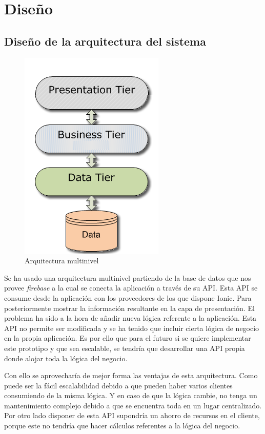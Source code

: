\section{Diseño}
\subsection{Diseño de la arquitectura del sistema}

\begin{figure}[!h]
    \centering
    \includegraphics[]{images/multilevel-architecture.png}
    \caption{Arquitectura multinivel}
    \label{multilevel-architecture}
\end{figure}

Se ha usado una arquitectura multinivel partiendo de la base de datos que nos provee
\textit{firebase} a la cual se conecta la aplicación a través de su API. Esta API
se consume desde la aplicación con los proveedores de los que dispone Ionic. Para
posteriormente mostrar la información resultante en la capa de presentación.
El problema ha sido a la hora de añadir nueva lógica referente a la aplicación.
Esta API no permite ser modificada y se ha tenido que incluir cierta lógica de
negocio en la propia aplicación. Es por ello que para el futuro si se quiere
implementar este prototipo y que sea escalable, se tendría que desarrollar una
API propia donde alojar toda la lógica del negocio.

\medskip
Con ello se aprovecharía de mejor forma las ventajas de esta arquitectura. Como
puede ser la fácil escalabilidad debido a que pueden haber varios clientes
consumiendo de la misma lógica. Y en caso de que la lógica cambie, no tenga un
mantenimiento complejo debido a que se encuentra toda en un lugar centralizado.
Por otro lado disponer de esta API supondría un ahorro de recursos en el cliente,
porque este no tendría que hacer cálculos referentes a la lógica del negocio.

